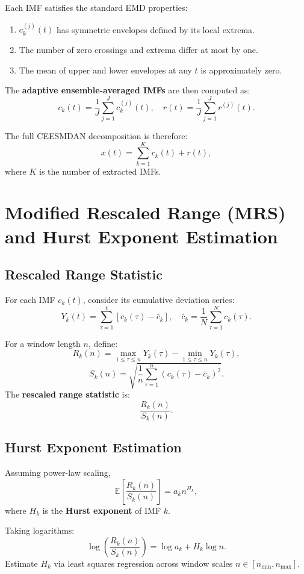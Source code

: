 \documentclass[11pt]{article}
\begin{document}
Each IMF satisfies the standard EMD properties:

\begin{enumerate}
  \item $c^{(j)}_k(t)$ has symmetric envelopes defined by its local extrema.
  \item The number of zero crossings and extrema differ at most by one.
  \item The mean of upper and lower envelopes at any $t$ is approximately zero.
\end{enumerate}

The \textbf{adaptive ensemble-averaged IMFs} are then computed as:
\[
c_k(t) = \frac{1}{J} \sum_{j=1}^{J} c^{(j)}_k(t),
\quad r(t) = \frac{1}{J} \sum_{j=1}^{J} r^{(j)}(t).
\]

The full CEESMDAN decomposition is therefore:
\[
x(t) = \sum_{k=1}^{K} c_k(t) + r(t),
\]
where $K$ is the number of extracted IMFs.



\section{Modified Rescaled Range (MRS) and Hurst Exponent Estimation}

\subsection{Rescaled Range Statistic}
For each IMF $c_k(t)$, consider its cumulative deviation series:
\[
Y_k(t) = \sum_{\tau=1}^{t} [c_k(\tau) - \bar{c}_k],
\quad \bar{c}_k = \frac{1}{N}\sum_{\tau=1}^{N} c_k(\tau).
\]

For a window length $n$, define:
\[
R_k(n) = \max_{1 \le \tau \le n} Y_k(\tau) - \min_{1 \le \tau \le n} Y_k(\tau),
\]
\[
S_k(n) = \sqrt{\frac{1}{n}\sum_{\tau=1}^{n} (c_k(\tau) - \bar{c}_k)^2}.
\]
The \textbf{rescaled range statistic} is:
\[
\frac{R_k(n)}{S_k(n)}.
\]

\subsection{Hurst Exponent Estimation}
Assuming power-law scaling,
\[
\mathbb{E}\left[\frac{R_k(n)}{S_k(n)}\right] = a_k n^{H_k},
\]
where $H_k$ is the \textbf{Hurst exponent} of IMF $k$.

Taking logarithms:
\[
\log\left(\frac{R_k(n)}{S_k(n)}\right) = \log a_k + H_k \log n.
\]
Estimate $H_k$ via least squares regression across window scales $n \in [n_{\min}, n_{\max}]$.
\end{document}
